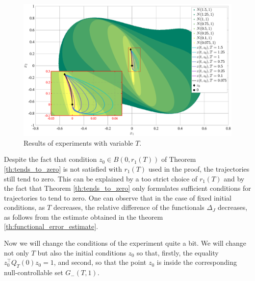 \documentclass[../main.tex]{subfiles}
\begin{document}
\begin{figure}
    \centering
    \includegraphics[width=\linewidth]{images/GusevMIOsipov_Duffing_fixed_z0.eps}
    \caption{Results of experiments with variable $T$.}
    \label{fig:series1}
\end{figure}

Despite the fact that condition $z_0 \in B(0,r_1(T))$ of Theorem \ref{th:tends_to_zero} is not satisfied with $r_1(T)$ used in the proof, the trajectories still tend to zero. This can be explained by a too strict choice of $r_1(T)$ and by the fact that Theorem \ref{th:tends_to_zero} only formulates sufficient conditions for trajectories to tend to zero. One can observe that in the case of fixed initial conditions, as $T$ decreases, the relative difference of the functionals $\Delta_J$ decreases, as follows from the estimate obtained in the theorem \ref{th:functional_error_estimate}.

Now we will change the conditions of the experiment quite a bit. We will change not only $T$ but also 
the initial conditions $z_0$ so that, firstly, the equality 
$z_0^{\top} Q_T(0) z_0 = 1$, and second, so that the point $z_0$ is inside 
the corresponding null-controllable set $G_{-}(T,1)$.
\end{document}
